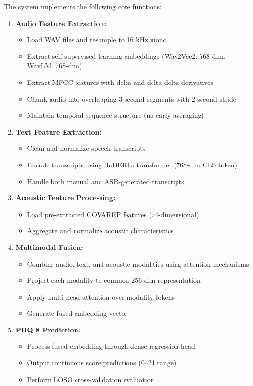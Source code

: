 \documentclass[12pt]{article}
\begin{document}
	The system implements the following core functions:

	\begin{enumerate}
		\item \textbf{Audio Feature Extraction:}
		\begin{itemize}
			\item Load WAV files and resample to 16 kHz mono
			\item Extract self-supervised learning embeddings (Wav2Vec2: 768-dim, WavLM: 768-dim)
			\item Extract MFCC features with delta and delta-delta derivatives
			\item Chunk audio into overlapping 3-second segments with 2-second stride
			\item Maintain temporal sequence structure (no early averaging)
		\end{itemize}

		\item \textbf{Text Feature Extraction:}
		\begin{itemize}
			\item Clean and normalize speech transcripts
			\item Encode transcripts using RoBERTa transformer (768-dim CLS token)
			\item Handle both manual and ASR-generated transcripts
		\end{itemize}

		\item \textbf{Acoustic Feature Processing:}
		\begin{itemize}
			\item Load pre-extracted COVAREP features (74-dimensional)
			\item Aggregate and normalize acoustic characteristics
		\end{itemize}

		\item \textbf{Multimodal Fusion:}
		\begin{itemize}
			\item Combine audio, text, and acoustic modalities using attention mechanisms
			\item Project each modality to common 256-dim representation
			\item Apply multi-head attention over modality tokens
			\item Generate fused embedding vector
		\end{itemize}

		\item \textbf{PHQ-8 Prediction:}
		\begin{itemize}
			\item Process fused embedding through dense regression head
			\item Output continuous score predictions (0--24 range)
			\item Perform LOSO cross-validation evaluation
		\end{itemize}


\end{enumerate}
\end{document}
